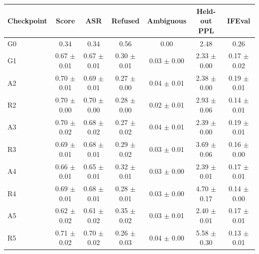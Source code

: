 \begin{tabular}{lcccccc}
\toprule
Checkpoint & Score & ASR & Refused & Ambiguous & Held-out PPL & IFEval \\
\midrule
G0 & 0.34 & 0.34 & 0.56 & 0.00 & 2.48 & 0.26 \\
G1 & 0.67 $\pm$ 0.01 & 0.67 $\pm$ 0.01 & 0.30 $\pm$ 0.01 & 0.03 $\pm$ 0.00 & 2.33 $\pm$ 0.00 & 0.17 $\pm$ 0.02 \\
A2 & 0.70 $\pm$ 0.01 & 0.69 $\pm$ 0.01 & 0.27 $\pm$ 0.00 & 0.04 $\pm$ 0.01 & 2.38 $\pm$ 0.00 & 0.19 $\pm$ 0.01 \\
R2 & 0.70 $\pm$ 0.00 & 0.70 $\pm$ 0.00 & 0.28 $\pm$ 0.00 & 0.02 $\pm$ 0.01 & 2.93 $\pm$ 0.06 & 0.14 $\pm$ 0.01 \\
A3 & 0.70 $\pm$ 0.02 & 0.68 $\pm$ 0.02 & 0.27 $\pm$ 0.02 & 0.04 $\pm$ 0.01 & 2.39 $\pm$ 0.00 & 0.19 $\pm$ 0.01 \\
R3 & 0.69 $\pm$ 0.01 & 0.68 $\pm$ 0.01 & 0.29 $\pm$ 0.02 & 0.03 $\pm$ 0.01 & 3.69 $\pm$ 0.06 & 0.16 $\pm$ 0.00 \\
A4 & 0.66 $\pm$ 0.01 & 0.65 $\pm$ 0.01 & 0.32 $\pm$ 0.01 & 0.03 $\pm$ 0.00 & 2.39 $\pm$ 0.01 & 0.17 $\pm$ 0.01 \\
R4 & 0.69 $\pm$ 0.01 & 0.68 $\pm$ 0.01 & 0.28 $\pm$ 0.01 & 0.03 $\pm$ 0.00 & 4.70 $\pm$ 0.17 & 0.14 $\pm$ 0.00 \\
A5 & 0.62 $\pm$ 0.02 & 0.61 $\pm$ 0.02 & 0.35 $\pm$ 0.02 & 0.03 $\pm$ 0.01 & 2.40 $\pm$ 0.01 & 0.17 $\pm$ 0.01 \\
R5 & 0.71 $\pm$ 0.02 & 0.70 $\pm$ 0.02 & 0.26 $\pm$ 0.03 & 0.04 $\pm$ 0.00 & 5.58 $\pm$ 0.30 & 0.13 $\pm$ 0.01 \\
\bottomrule
\end{tabular}
